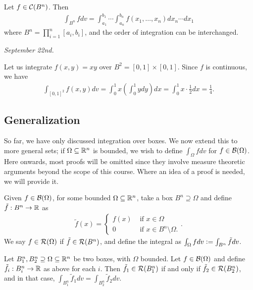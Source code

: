 \begin{corollary}
    Let $f \in \mathcal{C}(B^{n})$. Then 
    \begin{align}
        \int_{B^{n}} f dv = \int_{a_{1}}^{b_{1}} \cdots \int_{a_{n}}^{b_{n}} f(x_{1},\ldots,x_{n}) dx_{n} \cdots dx_{1}
    \end{align}
    where $B^{n} = \prod_{i=1}^{n} [a_{i},b_{i}]$, and the order of integration can be interchanged.
\end{corollary}

\textit{September 22nd.}
\begin{example}
    Let us integrate $f(x,y) = xy$ over $B^{2} = [0,1] \times [0,1]$. Since $f$ is continuous, we have
    \begin{align}
        \int_{[0,1]^{2}} f(x,y) dv = \int_{0}^{1} x\left( \int_{0}^{1}ydy \right)dx = \int_{0}^{1} x \cdot \frac{1}{2} dx = \frac{1}{4}.
    \end{align}
\end{example}

\subsection{Generalization}

So far, we have only discussed integration over boxes. We now extend this to more general sets; if $\Omega \subseteq \mathbb{R}^{n}$ is bounded, we wish to define $\int_{\Omega} f dv$ for $f \in \mathcal{B}(\Omega)$. Here onwards, most proofs will be omitted since they involve measure theoretic arguments beyond the scope of this course. Where an idea of a proof is needed, we will provide it.

\begin{definition}
    Given $f \in \mathcal{B}(\Omega)$, for some bounded $\Omega \subseteq \mathbb{R}^{n}$, take a box $B^{n} \supseteq \Omega$ and define $\tilde{f}:B^{n} \to \mathbb{R}$ as
    \begin{align}
        \tilde{f}(x) = \begin{cases}
            f(x) &\text{ if } x \in \Omega \\
            0 &\text{ if } x \in B^{n} \setminus \Omega.
        \end{cases}.
    \end{align}
    We say $f \in \mathcal{R}(\Omega)$ if $\tilde{f} \in \mathcal{R}(B^{n})$, and define the integral as $\int_{\Omega} f dv \vcentcolon= \int_{B^{n}} \tilde{f} dv$.
\end{definition}

\begin{theorem}
    Let $B_{1}^{n}, B_{2}^{n} \supseteq \Omega \subseteq \mathbb{R}^{n}$ be two boxes, with $\Omega$ bounded. Let $f \in \mathcal{B}(\Omega)$ and define $\tilde{f}_{i}:B_{i}^{n} \to \mathbb{R}$ as above for each $i$. Then $\tilde{f}_{1} \in \mathcal{R}(B_{1}^{n})$ if and only if $\tilde{f}_{2} \in \mathcal{R}(B_{2}^{n})$, and in that case, $\int_{B_{1}^{n}} \tilde{f}_{1} dv = \int_{B_{2}^{n}} \tilde{f}_{2} dv$.
\end{theorem}

